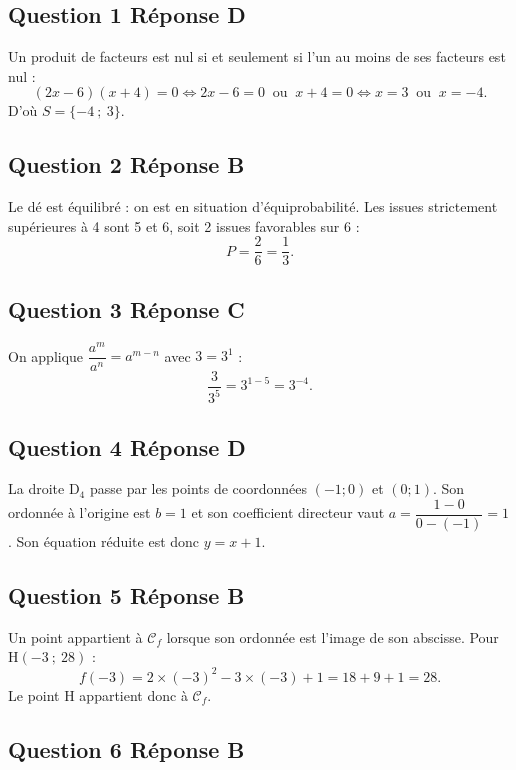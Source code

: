 \subsection*{Question 1 \quad Réponse D}

Un produit de facteurs est nul si et seulement si l'un au moins de ses facteurs est nul :
\[(2x - 6)(x + 4) = 0 \iff 2x - 6 = 0 \ \text{ ou } \ x + 4 = 0 \iff x = 3 \ \text{ ou } \ x = -4.\]
D'où $S = \{-4~;~3\}$.

\subsection*{Question 2 \quad Réponse B}

Le dé est équilibré : on est en situation d'équiprobabilité. Les issues strictement
supérieures à 4 sont 5 et 6, soit 2 issues favorables sur 6 :
\[P = \dfrac{2}{6} = \dfrac{1}{3}.\]

\subsection*{Question 3 \quad Réponse C}

On applique $\dfrac{a^m}{a^n} = a^{m-n}$ avec $3 = 3^1$ :
\[\dfrac{3}{3^5} = 3^{1-5} = 3^{-4}.\]

\subsection*{Question 4 \quad Réponse D}

La droite $\mathrm{D}_4$ passe par les points de coordonnées $(-1 ; 0)$ et $(0 ; 1)$. Son ordonnée à
l'origine est $b = 1$ et son coefficient directeur vaut
$a = \dfrac{1 - 0}{0 - (-1)} = 1$. Son équation réduite est donc $y = x + 1$.

\subsection*{Question 5 \quad Réponse B}

Un point appartient à $\mathcal{C}_f$ lorsque son ordonnée est l'image de son abscisse.
Pour H$(-3~;~28)$ :
\[f(-3) = 2\times(-3)^2 - 3\times(-3) + 1 = 18 + 9 + 1 = 28.\]
Le point H appartient donc à $\mathcal{C}_f$.

\subsection*{Question 6 \quad Réponse B}

